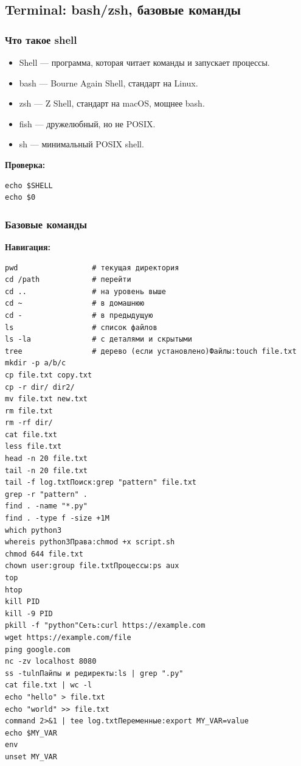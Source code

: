 \subsection{Terminal: bash/zsh, базовые команды}
\subsubsection{ Что такое shell}
\begin{itemize}
\item Shell — программа, которая читает команды и запускает процессы.
\item bash — Bourne Again Shell, стандарт на Linux.
\item zsh — Z Shell, стандарт на macOS, мощнее bash.
\item fish — дружелюбный, но не POSIX.
\item sh — минимальный POSIX shell.
\end{itemize}

\textbf{Проверка:}
\begin{lstlisting}
echo $SHELL
echo $0
\end{lstlisting}

\subsubsection{Базовые команды}

\textbf{Навигация:}
\begin{lstlisting}
pwd                 # текущая директория
cd /path            # перейти
cd ..               # на уровень выше
cd ~                # в домашнюю
cd -                # в предыдущую
ls                  # список файлов
ls -la              # с деталями и скрытыми
tree                # дерево (если установлено)Файлы:touch file.txt
mkdir -p a/b/c
cp file.txt copy.txt
cp -r dir/ dir2/
mv file.txt new.txt
rm file.txt
rm -rf dir/
cat file.txt
less file.txt
head -n 20 file.txt
tail -n 20 file.txt
tail -f log.txtПоиск:grep "pattern" file.txt
grep -r "pattern" .
find . -name "*.py"
find . -type f -size +1M
which python3
whereis python3Права:chmod +x script.sh
chmod 644 file.txt
chown user:group file.txtПроцессы:ps aux
top
htop
kill PID
kill -9 PID
pkill -f "python"Сеть:curl https://example.com
wget https://example.com/file
ping google.com
nc -zv localhost 8080
ss -tulnПайпы и редиректы:ls | grep ".py"
cat file.txt | wc -l
echo "hello" > file.txt
echo "world" >> file.txt
command 2>&1 | tee log.txtПеременные:export MY_VAR=value
echo $MY_VAR
env
unset MY_VAR
\end{lstlisting}

